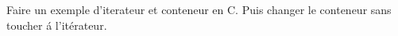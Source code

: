Faire un exemple d'iterateur et conteneur en C.
Puis changer le conteneur sans toucher \'a l'it\'erateur.

